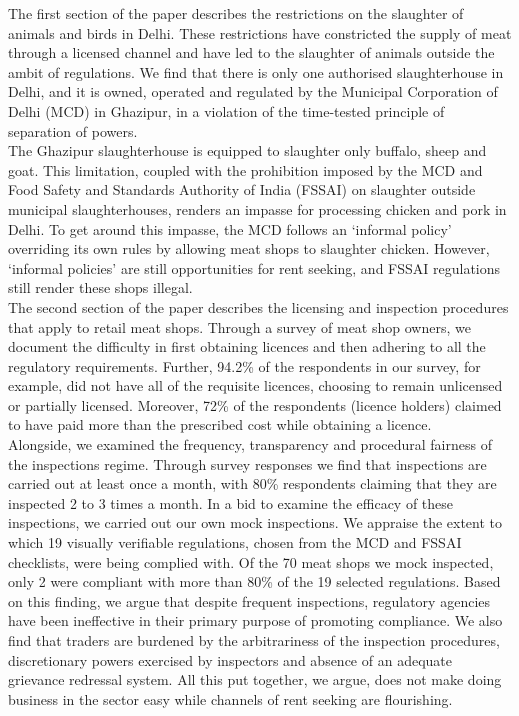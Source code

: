 \documentclass[a4paper, 12pt, twoside]{article}
\begin{document}
The first section of the paper describes the restrictions on the slaughter of animals and birds in Delhi. These restrictions have constricted the supply of meat through a licensed channel and have led to the slaughter of animals outside the ambit of regulations. We find that there is only one authorised slaughterhouse in Delhi, and it is owned, operated and regulated by the Municipal Corporation of Delhi (MCD) in Ghazipur, in a violation of the time-tested principle of separation of powers. \\

The Ghazipur slaughterhouse is equipped to slaughter only buffalo, sheep and goat. This limitation, coupled with the prohibition imposed by the MCD and Food Safety and Standards Authority of India (FSSAI) on slaughter outside municipal slaughterhouses, renders an impasse for processing chicken and pork in Delhi. To get around this impasse, the MCD follows an ‘informal policy’ overriding its own rules by allowing meat shops to slaughter chicken. However, ‘informal policies’ are still opportunities for rent seeking, and FSSAI regulations still render these shops illegal. \\

The second section of the paper describes the licensing and inspection procedures that apply to retail meat shops. Through a survey of meat shop owners, we document the difficulty in first obtaining licences and then adhering to all the regulatory requirements. Further, 94.2\% of the respondents in our survey, for example, did not have all of the requisite licences, choosing to remain unlicensed or partially licensed. Moreover, 72\% of the respondents (licence holders) claimed to have paid more than the prescribed cost while obtaining a licence. \\

Alongside, we examined the frequency, transparency and procedural fairness of the inspections regime. Through survey responses we find that inspections are carried out at least once a month, with 80\% respondents claiming that they are inspected 2 to 3 times a month. In a bid to examine the efficacy of these inspections, we carried out our own mock inspections. We appraise the extent to which 19 visually verifiable regulations, chosen from the MCD and FSSAI checklists, were being complied with. Of the 70 meat shops we mock inspected, only 2 were compliant with more than 80\% of the 19 selected regulations. Based on this finding, we argue that despite frequent inspections, regulatory agencies have been ineffective in their primary purpose of promoting compliance. We also find that traders are burdened by the arbitrariness of the inspection procedures, discretionary powers exercised by inspectors and absence of an adequate grievance redressal system. All this put together, we argue, does not make doing business in the sector easy while channels of rent seeking are flourishing. 
\end{document}
